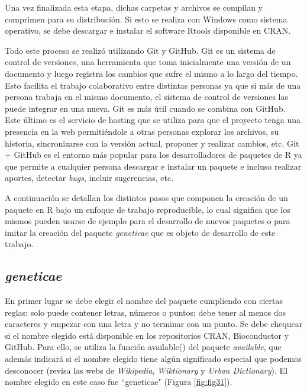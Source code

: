Una vez finalizada esta etapa, dichas carpetas y archivos se compilan y comprimen para su distribución. Si esto se realiza con Windows como sistema operativo, se debe descargar e instalar el software Rtools disponible en CRAN. 

Todo este proceso se realizó utilizando Git y GitHub. Git es un sistema de control de versiones, una herramienta que toma inicialmente una versión de un documento y luego registra los cambios que sufre el mismo a lo largo del tiempo. Esto facilita el trabajo colaborativo entre distintas personas ya que si más de una persona trabaja en el mismo documento, el sistema de control de versiones las puede integrar en una nueva. Git es más útil cuando se combina con GitHub. Este último es el servicio de hosting que se utiliza para que el proyecto tenga una presencia en la web permitiéndole a otras personas explorar los archivos, su historia, sincronizarse con la versión actual, proponer y realizar cambios, etc. Git + GitHub es el entorno más popular para los desarrolladores de paquetes de R ya que permite a cualquier persona descargar e instalar un paquete e incluso realizar aportes, detectar \emph{bugs}, incluir sugerencias, etc.


A continuación se detallan los distintos pasos que componen la creación de un paquete en R bajo un enfoque de trabajo reproducible, lo cual significa que los mismos pueden usarse de ejemplo para el desarrollo de nuevos paquetes o para imitar la creación del paquete \emph{geneticae} que es objeto de desarrollo de este trabajo. 

\subsection{\emph{geneticae}}

En primer lugar se debe elegir el nombre del paquete cumpliendo con ciertas reglas: solo puede contener letras, números o puntos; debe tener al menos dos caracteres y empezar con una letra y no terminar con un punto. Se debe chequear si el nombre elegido está disponible en los repositorios  CRAN, Bioconductor y GitHub. Para ello, se utiliza la función \textcolor{fandango}{available()} del paquete \emph{available}, que además indicará si el nombre elegido tiene algún significado especial que podemos desconocer (revisa las webs de \emph{Wikipedia}, \emph{Wiktionary} y \emph{Urban Dictionary}). El nombre elegido en este caso fue ``geneticae"  (Figura \ref{fig:fig31}). 

